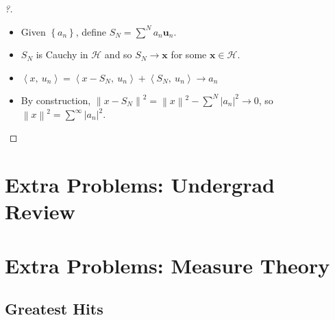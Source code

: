 \begin{proof}[?]

\envlist

\begin{itemize}
\tightlist
\item
  Given \(\left\{{a_{n}}\right\}\), define
  \(S_{N} = \sum^N a_{n} \mathbf{u}_{n}\).
\item
  \(S_{N}\) is Cauchy in \(\mathcal{H}\) and so \(S_{N} \to \mathbf{x}\)
  for some \(\mathbf{x} \in \mathcal{H}\).
\item
  \({\left\langle {x},~{u_{n}} \right\rangle} = {\left\langle {x - S_{N}},~{u_{n}} \right\rangle} + {\left\langle {S_{N}},~{u_{n}} \right\rangle} \to a_{n}\)
\item
  By construction,
  \({\left\lVert {x-S_{N}} \right\rVert}^2 = {\left\lVert {x} \right\rVert}^2 - \sum^N {\left\lvert {a_{n}} \right\rvert}^2 \to 0\),
  so
  \({\left\lVert {x} \right\rVert}^2 = \sum^\infty {\left\lvert {a_{n}} \right\rvert}^2\).
\end{itemize}

\end{proof}

\hypertarget{extra-problems-undergrad-review}{%
\section{Extra Problems: Undergrad
Review}\label{extra-problems-undergrad-review}}

\hypertarget{extra-problems-measure-theory}{%
\section{Extra Problems: Measure
Theory}\label{extra-problems-measure-theory}}

\hypertarget{greatest-hits}{%
\subsection{Greatest Hits}\label{greatest-hits}}

